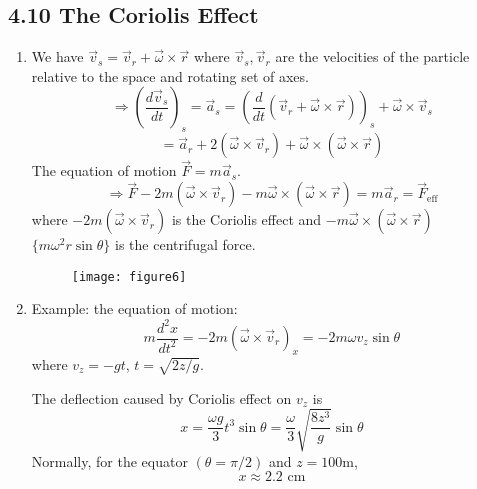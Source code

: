 \documentclass{article}
\begin{document}
	\subsection*{4.10 The Coriolis Effect}
	\begin{enumerate}
		\item We have $\vec{v}_s = \vec{v}_r + \vec{\omega} \times \vec{r}$ where $\vec{v}_s, \vec{v}_r$ are the velocities of the particle relative to the space and rotating set of axes.
		\[
		\Rightarrow \left(\frac{d\vec{v}_s}{dt}\right)_s = \vec{a}_s = \left(\frac{d}{dt}(\vec{v}_r + \vec{\omega}\times\vec{r})\right)_s + \vec{\omega} \times \vec{v}_s
		\]
		\[
		= \vec{a}_r + 2(\vec{\omega}\times\vec{v}_r) + \vec{\omega}\times(\vec{\omega}\times\vec{r})
		\]
		The equation of motion $\vec{F} = m\vec{a}_s$.
		\[
		\Rightarrow \vec{F} - 2m(\vec{\omega}\times\vec{v}_r) - m\vec{\omega}\times(\vec{\omega}\times\vec{r}) = m\vec{a}_r = \vec{F}_{\text{eff}}
		\]
		where $-2m(\vec{\omega}\times\vec{v}_r)$ is the Coriolis effect and $-m\vec{\omega}\times(\vec{\omega}\times\vec{r})$ $\{m\omega^2 r \sin\theta\}$ is the centrifugal force.
		
		\begin{figure}[h]
			\centering
			\texttt{[image: figure6]}
			\caption{}
			\label{fig:figure6}
		\end{figure}
		
		
		\item Example: the equation of motion:
		\[
		m\frac{d^2x}{dt^2} = -2m(\vec{\omega}\times\vec{v}_r)_x = -2m\omega v_z \sin\theta
		\]
		where $v_z = -gt$, $t = \sqrt{2z/g}$.
		
		The deflection caused by Coriolis effect on $v_z$ is
		\[
		x = \frac{\omega g}{3} t^3 \sin\theta = \frac{\omega}{3}\sqrt{\frac{8z^3}{g}} \sin\theta
		\]
		Normally, for the equator $(\theta = \pi/2)$ and $z=100$m,
		\[
		x \approx 2.2 \text{ cm}
		\]
	\end{enumerate}
\end{document}
